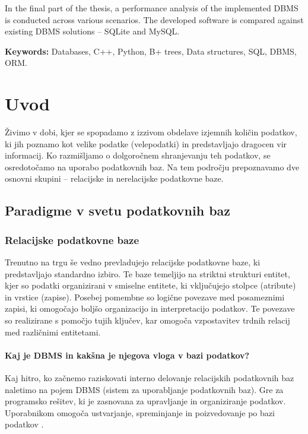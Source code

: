 \documentclass[a4paper,12pt,openright]{book}
\newcommand{\tkeywordsEn}{Databases, C++, Python, B+ trees, Data structures, SQL, DBMS, ORM}
\newcommand{\clearemptydoublepage}{\newpage{\pagestyle{empty}\cleardoublepage}}
\begin{document}
In the final part of the thesis, a performance analysis of the implemented DBMS is conducted across various scenarios. The developed software is compared against existing DBMS solutions – SQLite and MySQL.
\bigskip

\noindent\textbf{Keywords:} \tkeywordsEn.
\clearemptydoublepage

\mainmatter
\setcounter{page}{1}
\pagestyle{fancy}

\chapter{Uvod}
    Živimo v dobi, kjer se spopadamo z izzivom obdelave izjemnih količin podatkov, ki jih poznamo kot velike podatke (velepodatki) in predstavljajo dragocen vir informacij. Ko razmišljamo o dolgoročnem shranjevanju teh podatkov, se osredotočamo na uporabo podatkovnih baz. Na tem področju prepoznavamo dve osnovni skupini – relacijske in nerelacijske podatkovne baze.
    \section{Paradigme v svetu podatkovnih baz}
        \subsection{Relacijske podatkovne baze}
        Trenutno na trgu še vedno prevladujejo relacijske podatkovne baze, ki predstavljajo standardno izbiro. Te baze temeljijo na striktni strukturi entitet, kjer so podatki organizirani v smiselne entitete, ki vključujejo stolpce (atribute) in vrstice (zapise). Posebej pomembne so logične povezave med posameznimi zapisi, ki omogočajo boljšo organizacijo in interpretacijo podatkov. Te povezave so realizirane s pomočjo tujih ključev, kar omogoča vzpostavitev trdnih relacij med različnimi entitetami.

        \subsubsection{Kaj je DBMS in kakšna je njegova vloga v bazi podatkov?}

        Kaj hitro, ko začnemo raziskovati interno delovanje relacijskih podatkovnih baz naletimo na pojem DBMS (sistem za uporabljanje podatkovnih baz). Gre za programsko rešitev, ki je zasnovana za upravljanje in organiziranje podatkov. Uporabnikom omogoča ustvarjanje, spreminjanje in poizvedovanje po bazi podatkov \cite{DBMS_G4G}.
\end{document}
